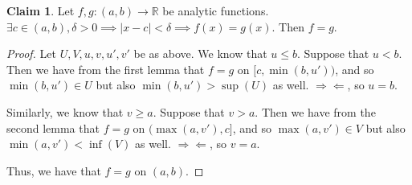 \documentclass[12pt,letterpaper]{article}
\theoremstyle{definition}
\newtheorem*{claim}{Claim}
\newcommand{\contra}{\Rightarrow\!\Leftarrow}
\newcommand{\R}{\mathbb{R}}
\begin{document}
\begin{claim}
  Let $f, g: (a,b) \rightarrow \R$ be analytic functions. $\exists c \in (a,b),
  \delta > 0 \implies |x - c| < \delta \implies f(x) = g(x)$. Then $f = g$.
\end{claim}

\begin{proof}
  Let $U, V, u, v, u', v'$ be as above. We know that $u \leq b$. Suppose that $u < b$. Then we have
  from the first lemma that $f = g$ on $[c, \min(b,u'))$, and so $\min(b,u') \in
  U$ but also $\min(b,u') > \sup(U)$ as well. $\contra$, so $u = b$.

  Similarly, we know that $v \geq a$. Suppose that $v > a$. Then we have from
  the second lemma that $f = g$ on $(\max(a,v'), c]$, and so $\max(a,v') \in V$
  but also $\min(a,v') < \inf(V)$ as well. $\contra$, so $v = a$.

  Thus, we have that $f = g$ on $(a,b)$.
\end{proof}
\end{document}
